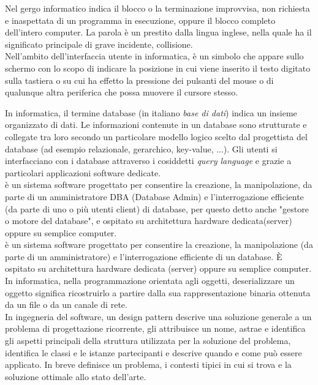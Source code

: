 \documentclass{scalatekids-article}
\begin{document}
 Nel gergo informatico indica il blocco o la terminazione improvvisa, non richiesta e inaspettata di un programma in esecuzione, oppure il blocco completo dell'intero computer.
La parola è un prestito dalla lingua inglese, nella quale ha il significato principale di grave incidente, collisione.
\\

 Nell'ambito dell'interfaccia utente in informatica, è un simbolo che appare sullo schermo con lo scopo di indicare la posizione in cui viene inserito il testo digitato sulla tastiera o su cui ha effetto la pressione dei pulsanti del mouse o di qualunque altra periferica che possa muovere il cursore stesso.
\\


 In informatica, il termine database (in italiano \textit{base di dati}) indica un insieme organizzato di dati.
Le informazioni contenute in un database sono strutturate e collegate tra loro secondo un particolare modello logico scelto dal progettista del database (ad esempio relazionale, gerarchico, key-value, ...).
Gli utenti si interfacciano con i database attraverso i cosiddetti \textit{query language} e grazie a particolari applicazioni software dedicate.
\\

 è un sistema software progettato per consentire la creazione, la manipolazione, da parte di un amministratore DBA (Database Admin) e l'interrogazione efficiente (da parte di uno o più utenti client) di database, per questo detto anche "gestore o motore del database", e ospitato su architettura hardware dedicata(server) oppure su semplice computer.
\\

 è un sistema software progettato per consentire la creazione, la manipolazione (da parte di un amministratore) e l'interrogazione efficiente di un database.
È ospitato su architettura hardware dedicata (server) oppure su semplice computer.
\\

 In informatica, nella programmazione orientata agli oggetti, deserializzare un oggetto significa ricostruirlo a partire dalla sua rappresentazione binaria ottenuta da un file o da un canale di rete.
\\

 In ingegneria del software, un design pattern descrive una soluzione generale a un problema di progettazione ricorrente, gli attribuisce un nome, astrae e identifica gli aspetti principali della struttura utilizzata per la soluzione del problema, identifica le classi e le istanze partecipanti e descrive quando e come può essere applicato. In breve definisce un problema, i contesti tipici in cui si trova e la soluzione ottimale allo stato dell'arte.
\\
\end{document}
